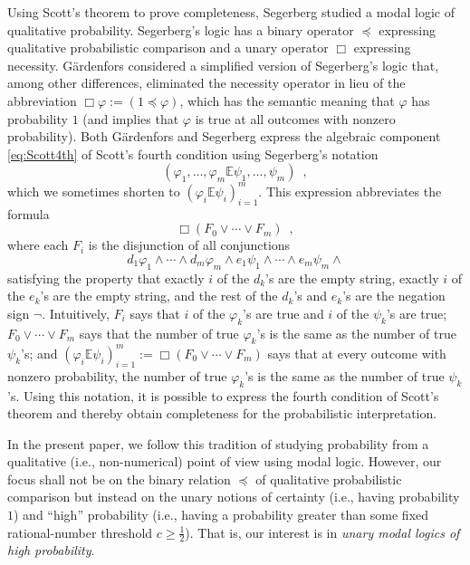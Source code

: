 \documentclass[12pt]{article}
\theoremstyle{definition}
\begin{document}
Using Scott's theorem to prove completeness, Segerberg
\cite{Segerberg1971:qpiams} studied a modal logic of qualitative
probability.  Segerberg's logic has a binary operator $\preceq$
expressing qualitative probabilistic comparison and a unary operator
$\Box$ expressing necessity.  G{\"a}rdenfors \cite{Gardenfors75}
considered a simplified version of Segerberg's logic that, among other
differences, eliminated the necessity operator in lieu of the
abbreviation $\Box\varphi:=(1\preceq\varphi)$, which has the semantic
meaning that $\varphi$ has probability $1$ (and implies that $\varphi$
is true at all outcomes with nonzero probability).  Both
G{\"a}rdenfors and Segerberg express the algebraic component
\eqref{eq:Scott4th} of Scott's fourth condition using Segerberg's
notation
\[
(\varphi_1,\dots,\varphi_m\mathbb{E}\psi_1,\dots,\psi_m)\enspace,
\]
which we sometimes shorten to
$(\varphi_i\mathbb{E}\psi_i)_{i=1}^m$. This expression abbreviates the
formula
\[
\Box(F_0\lor\cdots\lor F_m)\enspace,
\]
where each $F_i$ is the disjunction of all conjunctions
\[
d_1\varphi_1\land\cdots\land d_m\varphi_m\land
e_1\psi_1\land\cdots\land e_m\psi_m\land
\]
satisfying the property that exactly $i$ of the $d_k$'s are the empty
string, exactly $i$ of the $e_k$'s are the empty string, and the rest
of the $d_k$'s and $e_k$'s are the negation sign $\lnot$.
Intuitively, $F_i$ says that $i$ of the $\varphi_k$'s are true and $i$
of the $\psi_k$'s are true; $F_0\lor\cdots\lor F_m$ says that the
number of true $\varphi_k$'s is the same as the number of true
$\psi_k$'s; and
$(\varphi_i\mathbb{E}\psi_i)_{i=1}^m:=\Box(F_0\lor\cdots\lor F_m)$
says that at every outcome with nonzero probability, the number of
true $\varphi_k$'s is the same as the number of true $\psi_k$'s.
Using this notation, it is possible to express the fourth condition of
Scott's theorem and thereby obtain completeness for the probabilistic
interpretation.

In the present paper, we follow this tradition of studying probability
from a qualitative (i.e., non-numerical) point of view using modal
logic.  However, our focus shall not be on the binary relation
$\preceq$ of qualitative probabilistic comparison but instead on the
unary notions of certainty (i.e., having probability $1$) and ``high''
probability (i.e., having a probability greater than some fixed
rational-number threshold $c\geq\frac 12$). That is, our interest is
in \emph{unary modal logics of high probability}.
\end{document}
